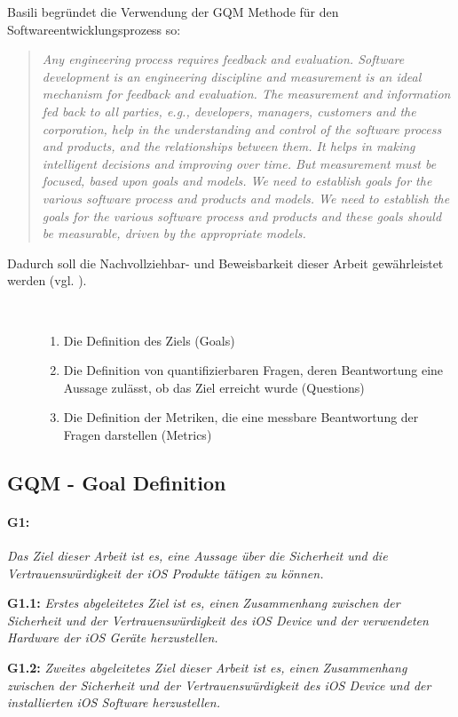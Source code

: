 Basili begründet die Verwendung der GQM Methode für den Softwareentwicklungsprozess so: 
\begin{quote}
    \textit{\glqq Any engineering process requires feedback and evaluation. Software development is an engineering discipline and measurement is an ideal mechanism for feedback and evaluation. The measurement and information fed back to all parties, e.g., developers, managers, customers and the corporation, help in the understanding and control of the software process and products, and the relationships between them. It helps in making intelligent decisions and improving over time. But measurement must be focused, based upon goals and models. We need to establish goals for the various software process and products and models. We need to establish the goals for the various software process and products and these goals should be measurable, driven by the appropriate models.\grqq{}} \cite{GQM[4]} 
\end{quote}
 
Dadurch soll die Nachvollziehbar- und Beweisbarkeit dieser Arbeit gewährleistet werden (vgl. \cite{GQM[3], GQM[4]}).
\begin{description}
    \item[\parbox{\textwidth} {Die GQM-Methode ist in drei Schritte unterteilt und dient zur Bewertung der erhobenen Daten}]~\par
    \begin{enumerate}
        \item Die Definition des Ziels (Goals)
        \item Die Definition von quantifizierbaren Fragen, deren Beantwortung eine Aussage zulässt, ob das Ziel erreicht wurde (Questions)
        \item Die Definition der Metriken, die eine messbare Beantwortung der Fragen darstellen (Metrics)
    \end{enumerate}
\end{description} 

\newpage
\subsection{GQM - Goal Definition}
\label{sec:GQMGoal}

\paragraph{G1:} \textit{\glqq Das Ziel dieser Arbeit ist es, eine Aussage über die Sicherheit und die Vertrauenswürdigkeit der iOS Produkte tätigen zu können.\grqq{}} \par 
\textbf{G1.1:} \textit{\glqq Erstes abgeleitetes Ziel ist es, einen Zusammenhang zwischen der Sicherheit und der Vertrauenswürdigkeit des iOS Device und der verwendeten Hardware der iOS Geräte herzustellen.\grqq{}} \par 
\textbf{G1.2:} \textit{\glqq Zweites abgeleitetes Ziel dieser Arbeit ist es, einen Zusammenhang zwischen der Sicherheit und der Vertrauenswürdigkeit des iOS Device und der installierten iOS Software herzustellen.\grqq{}}

